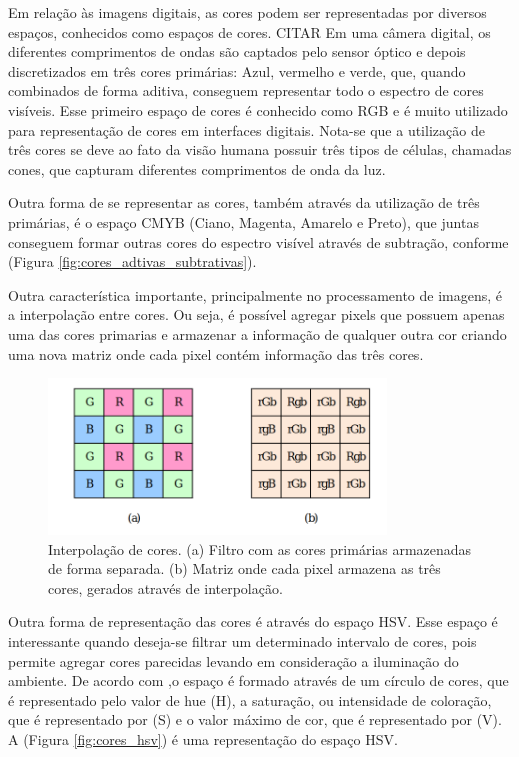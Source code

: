 Em relação às imagens digitais, as cores podem ser representadas por diversos espaços, conhecidos como espaços de cores. CITAR Em uma câmera digital, os diferentes comprimentos de ondas são captados pelo sensor óptico e depois discretizados em três cores primárias: Azul, vermelho e verde, que, quando combinados de forma aditiva, conseguem representar todo o espectro de cores visíveis. Esse primeiro espaço de cores é conhecido como RGB e é muito utilizado para representação de cores em interfaces digitais. Nota-se que a utilização de três cores se deve ao fato da visão humana possuir três tipos de células, chamadas cones, que capturam diferentes comprimentos de onda da luz.\cite{szeliski2021computer}
\par
Outra forma de se representar as cores, também através da utilização de três primárias, é o espaço CMYB (Ciano, Magenta, Amarelo e Preto), que juntas conseguem formar outras cores do espectro visível através de subtração, conforme (Figura \ref{fig:cores_adtivas_subtrativas}).
\par
Outra característica importante, principalmente no processamento de imagens, é a interpolação entre cores. Ou seja, é possível agregar pixels que possuem apenas uma das cores primarias e armazenar a informação de qualquer outra cor criando uma nova matriz onde cada pixel contém informação das três cores.
\begin{figure}[ht]
    \centering
    \includegraphics[width=0.8\textwidth]{capitulos/interpolacao_cores.png}
    \caption{Interpolação de cores. (a) Filtro com as cores primárias armazenadas de forma separada. (b) Matriz onde cada pixel armazena as três cores, gerados através de interpolação. \cite{szeliski2021computer}}
    \label{fig:interpolacao_cores}
\end{figure}
\par
Outra forma de representação das cores é através do espaço HSV. Esse espaço é interessante quando deseja-se filtrar um determinado intervalo de cores, pois permite agregar cores parecidas levando em consideração a iluminação do ambiente. De acordo com ,o espaço é formado através de um círculo de cores, que é representado pelo valor de hue (H), a saturação, ou intensidade de coloração, que é representado por (S) e o valor máximo de cor, que é representado por (V). A (Figura \ref{fig:cores_hsv}) é uma representação do espaço HSV.
